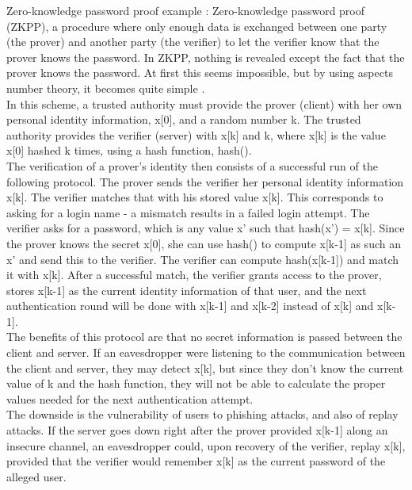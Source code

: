 \documentclass[11pt]{article}
\begin{document}
Zero-knowledge password proof example \cite{huth}:
Zero-knowledge password proof (ZKPP), a procedure where only enough data is exchanged between one party (the prover) and another party (the verifier) to let the verifier know that the prover knows the password.  In ZKPP, nothing is revealed except the fact that the prover knows the password.  At first this seems impossible, but by using aspects number theory, it becomes quite simple \cite{gqprotocol}.\\
	In this scheme, a trusted authority must provide the prover (client) with her own personal identity information, x[0], and a random number k.  The trusted authority provides the verifier (server) with x[k] and k, where x[k] is the value x[0] hashed k times, using a hash function, hash().\\
	The verification of a prover's identity then consists of a successful run of the following protocol.  The prover sends the verifier her personal identity information x[k].  The verifier matches that with his stored value x[k].  This corresponds to asking for a login name - a mismatch results in a failed login attempt.  The verifier asks for a password, which is any value x' such that hash(x') = x[k]. Since the prover knows the secret x[0], she can use hash() to compute x[k-1] as such an x' and send this to the verifier.  The verifier can compute hash(x[k-1]) and match it with x[k].  After a successful match, the verifier grants access to the prover, stores x[k-1] as the current identity information of that user, and the next authentication round will be done with x[k-1] and x[k-2] instead of x[k] and x[k-1].\\
	The benefits of this protocol are that no secret information is passed between the client and server.  If an eavesdropper were listening to the communication between the client and server, they may detect x[k], but since they don't know the current value of k and the hash function, they will not be able to calculate the proper values needed for the next authentication attempt.\\
	The downside is the vulnerability of users to phishing attacks, and also of replay attacks.  If the server goes down right after the prover provided x[k-1] along an insecure channel, an eavesdropper could, upon recovery of the verifier, replay x[k], provided that the verifier would remember x[k] as the current password of the alleged user.\\
\end{document}
